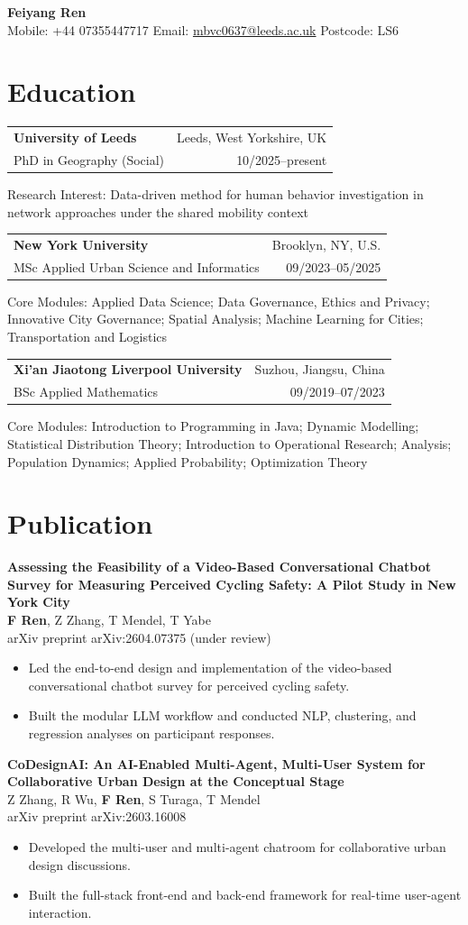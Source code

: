 \documentclass[10pt,letterpaper]{article}
\makeatletter
\newcommand{\entry}[4]{%
  \begin{tabularx}{\textwidth}{@{}Xr@{}}
    \textbf{#1} & #3 \\
    #2 & #4 \\
  \end{tabularx}
}
\newcommand{\pubtitle}[1]{\textbf{#1}\\}
\makeatother
\begin{document}
\begin{center}
{\LARGE \textbf{Feiyang Ren}}\\
Mobile: +44 07355447717 \textbar{} Email: \href{mailto:mbvc0637@leeds.ac.uk}{mbvc0637@leeds.ac.uk} \textbar{} Postcode: LS6
\end{center}

\section*{Education}
\entry{University of Leeds}{PhD in Geography (Social)}{Leeds, West Yorkshire, UK}{10/2025--present}
Research Interest: Data-driven method for human behavior investigation in network approaches under the shared mobility context

\vspace{2pt}
\entry{New York University}{MSc Applied Urban Science and Informatics}{Brooklyn, NY, U.S.}{09/2023--05/2025}
Core Modules: Applied Data Science; Data Governance, Ethics and Privacy; Innovative City Governance; Spatial Analysis; Machine Learning for Cities; Transportation and Logistics

\vspace{2pt}
\entry{Xi'an Jiaotong Liverpool University}{BSc Applied Mathematics}{Suzhou, Jiangsu, China}{09/2019--07/2023}
Core Modules: Introduction to Programming in Java; Dynamic Modelling; Statistical Distribution Theory; Introduction to Operational Research; Analysis; Population Dynamics; Applied Probability; Optimization Theory

\section*{Publication}
\pubtitle{Assessing the Feasibility of a Video-Based Conversational Chatbot Survey for Measuring Perceived Cycling Safety: A Pilot Study in New York City}
\textbf{F Ren}, Z Zhang, T Mendel, T Yabe\\
arXiv preprint arXiv:2604.07375 (under review)
\begin{itemize}
  \item Led the end-to-end design and implementation of the video-based conversational chatbot survey for perceived cycling safety.
  \item Built the modular LLM workflow and conducted NLP, clustering, and regression analyses on participant responses.
\end{itemize}

\vspace{3pt}
\pubtitle{CoDesignAI: An AI-Enabled Multi-Agent, Multi-User System for Collaborative Urban Design at the Conceptual Stage}
Z Zhang, R Wu, \textbf{F Ren}, S Turaga, T Mendel\\
arXiv preprint arXiv:2603.16008
\begin{itemize}
  \item Developed the multi-user and multi-agent chatroom for collaborative urban design discussions.
  \item Built the full-stack front-end and back-end framework for real-time user-agent interaction.
\end{itemize}
\end{document}
